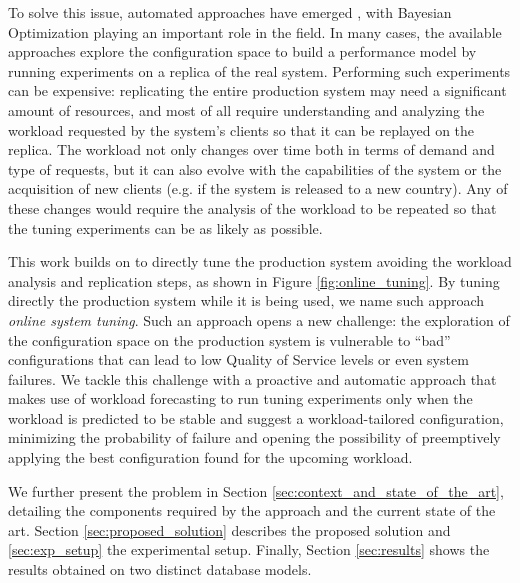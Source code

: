 \documentclass[a4paper, 12pt]{article} %
\begin{document}
	To solve this issue, automated approaches have emerged \cite{AkamasCGP, LearningToSample, OtterTune, OtterTune2}, with Bayesian Optimization playing an important role in the field. In many cases, the available approaches explore the configuration space to build a performance model by running experiments on a replica of the real system. Performing such experiments can be expensive: replicating the entire production system may need a significant amount of resources, and most of all require understanding and analyzing the workload requested by the system's clients so that it can be replayed on the replica. The workload not only changes over time both in terms of demand and type of requests, but it can also evolve with the capabilities of the system or the acquisition of new clients (e.g. if the system is released to a new country). Any of these changes would require the analysis of the workload to be repeated so that the tuning experiments can be as likely as possible.
	
	This work builds on \cite{AkamasCGP} to directly tune the production system avoiding the workload analysis and replication steps, as shown in Figure \ref{fig:online_tuning}. By tuning directly the production system while it is being used, we name such approach \textit{online system tuning}. Such an approach opens a new challenge: the exploration of the configuration space on the production system is vulnerable to ``bad'' configurations that can lead to low Quality of Service levels or even system failures.  We tackle this challenge with a proactive and automatic approach that makes use of workload forecasting to run tuning experiments only when the workload is predicted to be stable and suggest a workload-tailored configuration, minimizing the probability of failure and opening the possibility of preemptively applying the best configuration found for the upcoming workload. 
	
	We further present the problem in Section \ref{sec:context_and_state_of_the_art}, detailing the components required by the approach and the current state of the art. Section \ref{sec:proposed_solution} describes the proposed solution and \ref{sec:exp_setup} the experimental setup. Finally, Section \ref{sec:results} shows the results obtained on two distinct database models.
	
\end{document}
